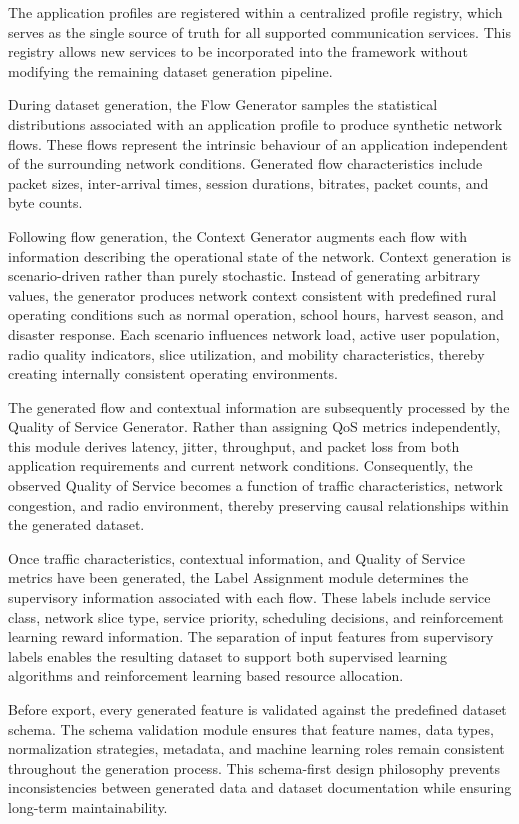 \documentclass[12pt,a4paper]{article}
\begin{document}
The application profiles are registered within a centralized profile registry, which serves as the single source of truth for all supported communication services. This registry allows new services to be incorporated into the framework without modifying the remaining dataset generation pipeline.

During dataset generation, the Flow Generator samples the statistical distributions associated with an application profile to produce synthetic network flows. These flows represent the intrinsic behaviour of an application independent of the surrounding network conditions. Generated flow characteristics include packet sizes, inter-arrival times, session durations, bitrates, packet counts, and byte counts.

Following flow generation, the Context Generator augments each flow with information describing the operational state of the network. Context generation is scenario-driven rather than purely stochastic. Instead of generating arbitrary values, the generator produces network context consistent with predefined rural operating conditions such as normal operation, school hours, harvest season, and disaster response. Each scenario influences network load, active user population, radio quality indicators, slice utilization, and mobility characteristics, thereby creating internally consistent operating environments.

The generated flow and contextual information are subsequently processed by the Quality of Service Generator. Rather than assigning QoS metrics independently, this module derives latency, jitter, throughput, and packet loss from both application requirements and current network conditions. Consequently, the observed Quality of Service becomes a function of traffic characteristics, network congestion, and radio environment, thereby preserving causal relationships within the generated dataset.

Once traffic characteristics, contextual information, and Quality of Service metrics have been generated, the Label Assignment module determines the supervisory information associated with each flow. These labels include service class, network slice type, service priority, scheduling decisions, and reinforcement learning reward information. The separation of input features from supervisory labels enables the resulting dataset to support both supervised learning algorithms and reinforcement learning based resource allocation.

Before export, every generated feature is validated against the predefined dataset schema. The schema validation module ensures that feature names, data types, normalization strategies, metadata, and machine learning roles remain consistent throughout the generation process. This schema-first design philosophy prevents inconsistencies between generated data and dataset documentation while ensuring long-term maintainability.
\end{document}
